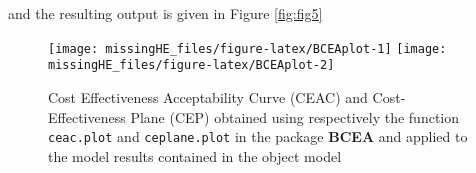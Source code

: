 \documentclass[]{article}
\begin{document}
and the resulting output is given in Figure \ref{fig:fig5}

\begin{figure}[H]

{\centering \texttt{[image: missingHE\_files/figure-latex/BCEAplot-1]}
\centering \texttt{[image: missingHE\_files/figure-latex/BCEAplot-2]} 
}

\caption{\label{fig:fig5}Cost Effectiveness Acceptability Curve (CEAC) and Cost-Effectiveness Plane (CEP) obtained using respectively the function \texttt{ceac.plot} and \texttt{ceplane.plot} in the package \textbf{BCEA} and applied to the model results contained in the object model}\label{fig:BCEAplot1}
\end{figure}

\renewcommand\refname{References}

\end{document}
